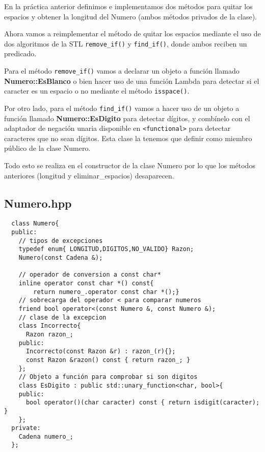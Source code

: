 En la práctica anterior definimos e implementamos dos métodos para quitar los espacios y obtener la longitud del Numero (ambos métodos privados de la clase).

Ahora vamos a reimplementar el método de quitar los espacios mediante el uso de dos algoritmos de la STL \texttt{remove\_if()} y \texttt{find\_if()}, donde ambos reciben un predicado.

Para el método \texttt{remove\_if()} vamos a declarar un objeto a función llamado \textbf{Numero::EsBlanco} o bien hacer uso de una función Lambda para detectar si el caracter es un espacio o no mediante el método \texttt{isspace()}.

Por otro lado, para el método \texttt{find\_if()} vamos a hacer uso de un objeto a función llamado \textbf{Numero::EsDigito} para detectar dígitos, y combínelo con el adaptador de negación unaria disponible en \texttt{<functional>} para detectar
caracteres que no sean dígitos. Esta clase la tenemos que definir como miembro público de la clase Numero.

Todo esto se realiza en el constructor de la clase Numero por lo que los métodos anteriores (longitud y eliminar\_espacios) desaparecen.
\subsection{Numero.hpp}
\begin{verbatim}
  class Numero{
  public:
    // tipos de excepciones
    typedef enum{ LONGITUD,DIGITOS,NO_VALIDO} Razon;
    Numero(const Cadena &);
  
    // operador de conversion a const char*
    inline operator const char *() const{
        return numero_.operator const char *();}
    // sobrecarga del operador < para comparar numeros
    friend bool operator<(const Numero &, const Numero &);
    // clase de la excepcion
    class Incorrecto{
      Razon razon_;
    public:
      Incorrecto(const Razon &r) : razon_(r){};
      const Razon &razon() const { return razon_; }
    };
    // Objeto a función para comprobar si son digitos
    class EsDigito : public std::unary_function<char, bool>{
    public:
      bool operator()(char caracter) const { return isdigit(caracter); }
    };
  private:
    Cadena numero_;
  };
\end{verbatim}

